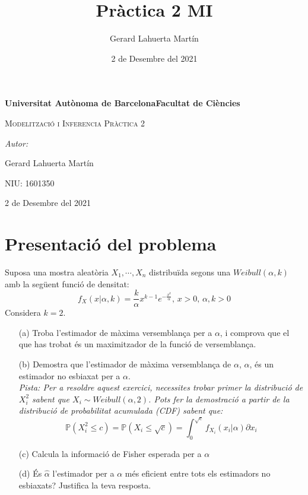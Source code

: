\documentclass[12pt]{article}
\title{Pràctica 2 MI}
\author{Gerard Lahuerta Martín}
\date{2 de Desembre del 2021}
\begin{document}
\begin{titlepage}
    \centering
    \vspace{4cm}
    {\bfseries\LARGE Universitat Autònoma de Barcelona\newline Facultat de Ciències\par}
    \vspace{6cm}
    {\scshape\Huge Modelització i Inferencia Pràctica 2 \par} 
    \vspace{2cm}
    {\Large \itshape Autor: \par}
    {\Large Gerard Lahuerta Martín\par}
    {\small NIU: 1601350\par}
    \vspace{3cm}
    {\Large 2 de Desembre del 2021\par}
\end{titlepage}

\justifying


\newpage
\setcounter{page}{2}
\pagestyle{plain}
\tableofcontents
\cleardoublepage
{}


\section{Presentació del problema}
Suposa una mostra aleatòria $X_1, \cdots , X_n$ distribuïda segons una $Weibull(\alpha,k)$ amb la següent 
funció de densitat:
$$f_X(x|\alpha,k) = \frac{k}{\alpha}x^{k-1}e^{-\frac{x^k}{\alpha}}\text{, }x>0\text{, } \alpha,k>0$$
Considera $k=2$.
\begin{enumerate}
\item [(a)] Troba l'estimador de màxima versemblança per a $\alpha$, i comprova que el que has trobat és un maximitzador de la funció de versemblança.
\item [(b)] Demostra que l'estimador de màxima versemblança de $\alpha$, $\hat{\alpha}$, és un estimador no esbiaxat per a $\alpha$.\\
\textit{Pista: Per a resoldre aquest exercici, necessites trobar primer la distribució de $X_i^2$ sabent que $X_i \sim Weibull(\alpha,2)$. Pots fer la demostració a partir de la distribució de probabilitat acumulada (CDF) sabent que:}
$$\mathbb{P}(X_i^2\leq c) = \mathbb{P}(X_i\leq \sqrt{c}) = \int_{0}^{\sqrt{c}} f_{X_i}(x_i|\alpha)\partial x_i$$
\item [(c)] Calcula la informació de Fisher esperada per a $\alpha$
\item [(d)] És $\hat{\alpha}$ l'estimador per a $\alpha$ més eficient entre tots els estimadors no esbiaxats? Justifica la teva resposta.
\end{enumerate}
\newpage
\end{document}
